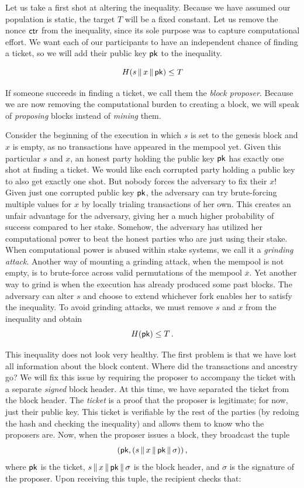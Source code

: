 Let us take a first shot at altering the inequality. Because we have assumed our population
is static, the target $T$ will be a fixed constant. Let us remove the nonce $\mathsf{ctr}$ from the inequality,
since its sole purpose was to capture computational effort. We want each of our participants
to have an independent chance of finding a ticket, so we will add their public key $\mathsf{pk}$ to the
inequality.

\[
  H(s \,\|\, x \,\|\, \mathsf{pk}) \leq T
\]

If someone succeeds in finding a ticket, we call them the \emph{block proposer}.
Because we are now removing the computational burden to creating a block, we will speak of
\emph{proposing} blocks instead of \emph{mining} them.

Consider the beginning of the execution in which $s$ is set to the genesis block and $x$ is empty,
as no transactions have appeared in the mempool yet. Given this particular $s$ and $x$, an honest
party holding the public key $\mathsf{pk}$ has exactly one
shot at finding a ticket. We would like each corrupted party holding a public key to also get
exactly one shot. But nobody forces the adversary to fix their $x$! Given just one
corrupted public key $\mathsf{pk}$, the adversary can try brute-forcing multiple values for $x$
by locally trialing transactions of her own. This creates an unfair advantage for the adversary,
giving her a much higher probability of success compared to her stake. Somehow, the adversary
has utilized her computational power to beat the honest parties who are just using their stake.
When computational power is abused within stake systems, we call it a
\emph{grinding attack}. Another way of mounting a grinding attack, when
the mempool is not empty, is to brute-force across valid permutations of the mempool $\overline{x}$.
Yet another way to grind is when the execution has already produced some past blocks.
The adversary can alter $s$ and choose to extend whichever fork enables her to satisfy the inequality.
To avoid grinding attacks, we must remove $s$ and $x$ from the inequality and obtain
\[
  H(\mathsf{pk}) \leq T\,.
\]

This inequality does not look very healthy. The first problem is that we have lost all information about the block
content. Where did the transactions and ancestry go? We will fix this issue by requiring
the proposer to accompany the ticket with a separate \emph{signed} block header.
At this time, we have separated the ticket from the block header.
The \emph{ticket} is a proof that the proposer is legitimate; for now, just their
public key. This ticket is verifiable by the rest of the parties (by redoing the hash and checking
the inequality) and allows them to know who the proposers are. Now, when the proposer issues a block,
they broadcast the tuple
\[
(\mathsf{pk}, (s \,\|\, x \,\|\, \mathsf{pk} \,\|\, \sigma))\,,
\]
where $\mathsf{pk}$ is the ticket, $s \,\|\, x \,\|\, \mathsf{pk} \,\|\, \sigma$ is the block header,
and $\sigma$ is the signature of the proposer. Upon receiving this tuple, the recipient checks
that:

